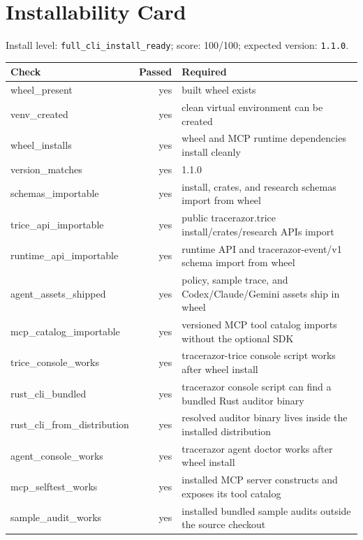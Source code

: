 \section{Installability Card}
Install level: \texttt{full\_cli\_install\_ready}; score: 100/100; expected version: \texttt{1.1.0}.

\begin{tabular}{lrl}
Check & Passed & Required \\
\hline
wheel\_present & yes & built wheel exists \\
venv\_created & yes & clean virtual environment can be created \\
wheel\_installs & yes & wheel and MCP runtime dependencies install cleanly \\
version\_matches & yes & 1.1.0 \\
schemas\_importable & yes & install, crates, and research schemas import from wheel \\
trice\_api\_importable & yes & public tracerazor.trice install/crates/research APIs import \\
runtime\_api\_importable & yes & runtime API and tracerazor-event/v1 schema import from wheel \\
agent\_assets\_shipped & yes & policy, sample trace, and Codex/Claude/Gemini assets ship in wheel \\
mcp\_catalog\_importable & yes & versioned MCP tool catalog imports without the optional SDK \\
trice\_console\_works & yes & tracerazor-trice console script works after wheel install \\
rust\_cli\_bundled & yes & tracerazor console script can find a bundled Rust auditor binary \\
rust\_cli\_from\_distribution & yes & resolved auditor binary lives inside the installed distribution \\
agent\_console\_works & yes & tracerazor agent doctor works after wheel install \\
mcp\_selftest\_works & yes & installed MCP server constructs and exposes its tool catalog \\
sample\_audit\_works & yes & installed bundled sample audits outside the source checkout \\
\end{tabular}
